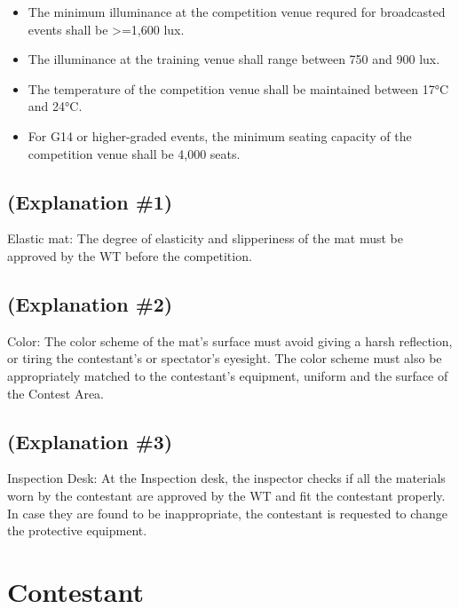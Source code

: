 \documentclass[
]{report}
\providecommand{\tightlist}{%
  \setlength{\itemsep}{0pt}\setlength{\parskip}{0pt}}
\begin{document}
\begin{enumerate}
  \begin{itemize}
  \tightlist
  \item
    The minimum illuminance at the competition venue requred for
    broadcasted events shall be \textgreater=1,600 lux.
  \item
    The illuminance at the training venue shall range between 750 and
    900 lux.
  \item
    The temperature of the competition venue shall be maintained between
    17°C and 24°C.
  \item
    For G14 or higher-graded events, the minimum seating capacity of the
    competition venue shall be 4,000 seats.
  \end{itemize}
\end{enumerate}

\section{(Explanation \#1)}\label{explanation-1}

Elastic mat: The degree of elasticity and slipperiness of the mat must
be approved by the WT before the competition.

\section{(Explanation \#2)}\label{explanation-2}

Color: The color scheme of the mat's surface must avoid giving a harsh
reflection, or tiring the contestant's or spectator's eyesight. The
color scheme must also be appropriately matched to the contestant's
equipment, uniform and the surface of the Contest Area.

\section{(Explanation \#3)}\label{explanation-3}

Inspection Desk: At the Inspection desk, the inspector checks if all the
materials worn by the contestant are approved by the WT and fit the
contestant properly. In case they are found to be inappropriate, the
contestant is requested to change the protective equipment.

\chapter{Contestant}\label{contestant}
\end{document}
